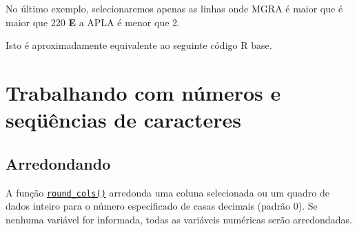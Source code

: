 \documentclass[
]{book}
\newenvironment{Shaded}{\begin{snugshade}}{\end{snugshade}}
\newcommand{\CommentTok}[1]{\textcolor[rgb]{0.56,0.35,0.01}{\textit{#1}}}
\newcommand{\DecValTok}[1]{\textcolor[rgb]{0.00,0.00,0.81}{#1}}
\newcommand{\KeywordTok}[1]{\textcolor[rgb]{0.13,0.29,0.53}{\textbf{#1}}}
\newcommand{\NormalTok}[1]{#1}
\newcommand{\OperatorTok}[1]{\textcolor[rgb]{0.81,0.36,0.00}{\textbf{#1}}}
\newcommand{\StringTok}[1]{\textcolor[rgb]{0.31,0.60,0.02}{#1}}
\begin{document}
No último exemplo, selecionaremos apenas as linhas onde MGRA é maior que é maior que 220 \textbf{E} a APLA é menor que 2.

\begin{Shaded}
\end{Shaded}

Isto é aproximadamente equivalente ao seguinte código R base.

\begin{Shaded}
\end{Shaded}

\hypertarget{trabalhando-com-nuxfameros-e-sequxfcuxeancias-de-caracteres}{%
\section{Trabalhando com números e seqüências de caracteres}\label{trabalhando-com-nuxfameros-e-sequxfcuxeancias-de-caracteres}}

\hypertarget{arredondando}{%
\subsection{Arredondando}\label{arredondando}}

A função \href{https://tiagoolivoto.github.io/metan/reference/utils_num_str.html}{\texttt{round\_cols()}} arredonda uma coluna selecionada ou um quadro de dados inteiro para o número especificado de casas decimais (padrão 0). Se nenhuma variável for informada, todas as variáveis numéricas serão arredondadas.
\end{document}
